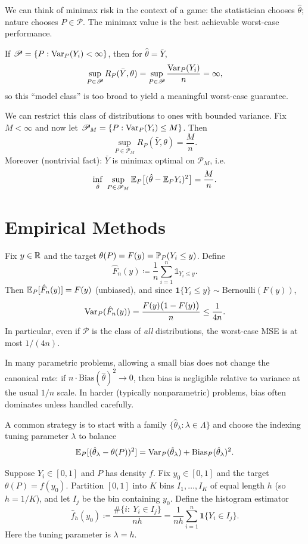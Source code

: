 We can think of minimax risk in the context of a game: the statistician chooses $\hat\theta$; nature chooses $P\in\mathscr P$.
The minimax value is the best achievable worst-case performance.

\begin{example}
	If $\mathscr P=\{P:\Var_P(Y_i)<\infty\}$, then for $\hat\theta=\bar Y$,
	\[
		\sup_{P\in\mathscr P} R_P(\bar Y,\theta)
		=
		\sup_{P\in\mathscr P}\frac{\Var_P(Y_i)}{n}
		= \infty,
	\]
	so this ``model class'' is too broad to yield a meaningful worst-case guarantee.

	We can restrict this class of distributions to ones with bounded variance. Fix $M<\infty$ and now let $\mathscr P_M=\{P:\Var_P(Y_i)\le M\}$. Then
	\[
		\sup_{P\in\mathscr P_M} R_P(\bar Y,\theta)
		=
		\frac{M}{n}.
	\]
	Moreover (nontrivial fact): $\bar Y$ is minimax optimal on $\mathscr P_M$, i.e.
	\[
		\inf_{\hat\theta}\ \sup_{P\in\mathscr P_M}\E_P\big[(\hat\theta-\E_P Y_i)^2\big]
		=
		\frac{M}{n}.
	\]
\end{example}

\section{Empirical Methods}

\begin{example}
	Fix $y\in\R$ and the target $\theta(P)=F(y)=\P_P(Y_i\le y)$.
	Define
	\[
		\hat F_n(y)\coloneqq\frac{1}{n}\sum_{i=1}^n \mathds{1}_{Y_i\le y}.
	\]
	Then $\E_P[\hat F_n(y)]=F(y)$ (unbiased), and since $\mathbf 1\{Y_i\le y\}\sim \mathrm{Bernoulli}(F(y))$,
	\[
		\Var_P(\hat F_n(y))
		=
		\frac{F(y)\big(1-F(y)\big)}{n}
		\le \frac{1}{4n}.
	\]
	In particular, even if $\mathscr P$ is the class of \emph{all} distributions, the worst-case MSE is at most $ 1/(4n)$.
\end{example}

In many parametric problems, allowing a small bias does not change the canonical rate: if
	$n\cdot \mathrm{Bias}(\hat\theta)^2 \to 0$, then bias is negligible relative to variance at the usual $1/n$ scale.
	In harder (typically nonparametric) problems, bias often dominates unless handled carefully.

A common strategy is to start with a family $\{\hat\theta_\lambda:\lambda\in\Lambda\}$ and choose the indexing tuning parameter $\lambda$
to balance
\[
	\E_P[(\hat\theta_\lambda-\theta(P))^2]
	=
	\Var_P(\hat\theta_\lambda)+\mathrm{Bias}_P(\hat\theta_\lambda)^2.
\]

\begin{example}
	Suppose $Y_i\in[0,1]$ and $P$ has density $f$. Fix $y_0\in[0,1]$ and the target $\theta(P)=f(y_0)$.
	Partition $[0,1]$ into $K$ bins $I_1,\dots,I_K$ of equal length $h$ (so $h=1/K$), and let $I_j$ be the bin
	containing $y_0$. Define the histogram estimator
	\[
		\hat f_h(y_0)
		\coloneqq
		\frac{\#\{i:\ Y_i\in I_j\}}{nh}
		=
		\frac{1}{nh}\sum_{i=1}^n \mathbf 1\{Y_i\in I_j\}.
	\]
	Here the tuning parameter is $\lambda=h$.
\end{example}

